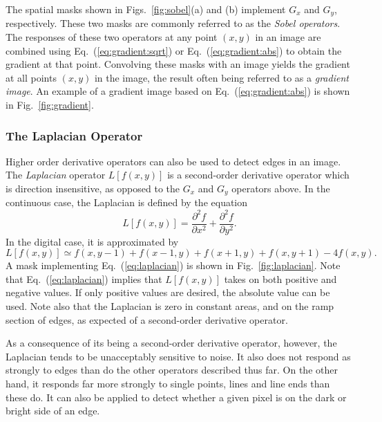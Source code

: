 The spatial masks shown in Figs.~\ref{fig:sobel}(a) and (b) implement
$G_{x}$ and $G_{y}$, respectively.  These two masks are commonly
referred to as the {\em Sobel operators\/}.  The responses of these
two operators at any point $(x,y)$ in an image are combined using
Eq.~(\ref{eq:gradient:sqrt}) or Eq.~(\ref{eq:gradient:abs}) to obtain
the gradient at that point.  Convolving these masks with an image
yields the gradient at all points $(x,y)$ in the image, the result
often being referred to as a {\em gradient image\/}.  An example of a
gradient image based on Eq.~(\ref{eq:gradient:abs}) is shown in
Fig.~\ref{fig:gradient}.


\subsubsection{The Laplacian Operator}

Higher order derivative operators can also be used to detect edges in
an image.  The {\em Laplacian\/} operator $L[f(x,y)]$ is a
second-order derivative operator which is direction insensitive, as
opposed to the $G_{x}$ and $G_{y}$ operators above.  In the continuous
case, the Laplacian is defined by the equation
\begin{equation}
  L[f(x,y)]=\frac{\partial^{2}f}{\partial x^{2}}+
  \frac{\partial^{2}f}{\partial y^{2}}\mbox{.}
\end{equation}
In the digital case, it is approximated by
\begin{equation}
\label{eq:laplacian}
  L[f(x,y)]\simeq f(x,y-1)+f(x-1,y)+f(x+1,y)+f(x,y+1)-4f(x,y)\mbox{.}
\end{equation}
A mask implementing Eq.~(\ref{eq:laplacian}) is shown in
Fig.~\ref{fig:laplacian}.  Note that Eq.~(\ref{eq:laplacian}) implies
that $L[f(x,y)]$ takes on both positive and negative values.  If only
positive values are desired, the absolute value can be used.  Note
also that the Laplacian is zero in constant areas, and on the ramp
section of edges, as expected of a second-order derivative operator.

As a consequence of its being a second-order derivative operator,
however, the Laplacian tends to be unacceptably sensitive to noise.
It also does not respond as strongly to edges than do the other
operators described thus far.  On the other hand, it responds far more
strongly to single points, lines and line ends than these do.  It can
also be applied to detect whether a given pixel is on the dark or
bright side of an edge.

